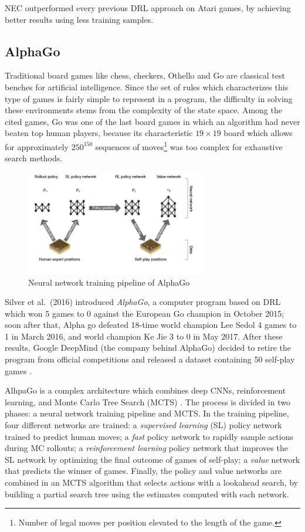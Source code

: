 NEC outperformed every previous DRL approach on Atari games, by achieving better
results using less training samples.

\subsection{AlphaGo}
Traditional board games like chess, checkers, Othello and Go are classical 
test benches for artificial intelligence. Since the set of rules which
characterizes this type of games is fairly simple to represent in a program, the
difficulty in solving these environments stems from the complexity of the 
state space. Among the cited games, Go was one of the last board games in which 
an algorithm had never beaten top human players, because its characteristic 
$19 \times 19$ board which allows for approximately $250^{150}$ sequences of
moves\footnote{Number of legal moves per position elevated to the length of the 
game.} was too complex for exhaustive search methods.
%
\begin{figure}[h]
\includegraphics[width=0.7\textwidth]{pictures/alphago}
\centering
\caption{Neural network training pipeline of AlphaGo}
\end{figure}
%

Silver et al.\ (2016) \cite{silver2016mastering} introduced \textit{AlphaGo}, 
a computer program based on DRL which won 5 games to 0 against the European Go 
champion in October 2015; soon after that, Alpha go defeated 18-time world 
champion Lee Sedol 4 games to 1 in March 2016, and world champion Ke Jie 3 to 0 
in May 2017. After these results, Google DeepMind (the company behind 
AlphaGo) decided to retire the program from official competitions and released a
dataset containing 50 self-play games \cite{alphago}.

AlhpaGo is a complex architecture which combines deep CNNs, reinforcement 
learning, and Monte Carlo Tree Search (MCTS) \cite{browne2012survey, gelly2012grand}. 
The process is divided in two phases: a neural network training pipeline and 
MCTS. In the training pipeline, four different networks are trained: a 
\textit{supervised learning} (SL) policy network trained to predict human moves;
a \textit{fast} policy network to rapidly sample actions during MC rollouts; a 
\textit{reinforcement learning} policy network that improves the SL network by 
optimizing the final outcome of games of self-play; a \textit{value} network 
that predicts the winner of games. Finally, the policy and value networks are 
combined in an MCTS algorithm that selects actions with a lookahead search, by 
building a partial search tree using the estimates computed with each network.

